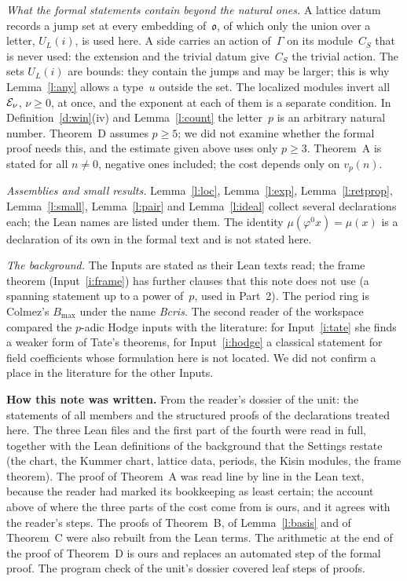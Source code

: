 \documentclass[11pt,a4paper]{article}
\newcommand{\m}[1]{\mbox{$#1$}}        %
\newcommand{\subhead}[1]{\par\addvspace{9pt plus 2pt}\Needspace{4\baselineskip}\noindent\textbf{#1}\enspace\ignorespaces}
\theoremstyle{plainx}
\theoremstyle{uprightx}
\providecommand{\fo}{\mathfrak{o}}\providecommand{\fc}{\mathfrak{c}}\providecommand{\fd}{\mathfrak{d}}
\begin{document}
\emph{What the formal statements contain beyond the natural ones.} A lattice datum records a jump set at every
embedding of~$\fo$, of which only the union over a letter, \m{U_L(i)}, is used here. A side carries an action of~$\Gamma$ on its module~$C_S$ that is never used: the extension and the trivial datum give~$C_S$ the trivial action. The sets \m{U_L(i)} are
bounds: they contain the jumps and may be larger; this is why Lemma~\ref{l:any} allows a type~$u$ outside the
set. The localized modules invert all~$\mathcal{E}_\nu$, \m{\nu\ge0}, at once, and the exponent at each of them is a
separate condition. In Definition~\ref{d:win}(iv) and Lemma~\ref{l:count} the letter~$p$ is an arbitrary natural
number. Theorem~D assumes \m{p\ge5}; we did not examine whether the formal proof needs this, and the estimate
given above uses only \m{p\ge3}. Theorem~A is stated for all \m{n\ne0}, negative ones included; the cost depends
only on \m{v_p(n)}.

\emph{Assemblies and small results.} Lemma~\ref{l:loc}, Lemma~\ref{l:exp}, Lemma~\ref{l:retprop},
Lemma~\ref{l:small}, Lemma~\ref{l:pair} and Lemma~\ref{l:ideal} collect several declarations each; the Lean
names are listed under them. The identity \m{\mu(\varphi^{0}x)=\mu(x)} is a declaration of its own in the formal
text and is not stated here.

\emph{The background.} The Inputs are stated as their Lean texts read; the frame theorem (Input~\ref{i:frame})
has further clauses that this note does not use (a spanning statement up to a power of~$p$, used in Part~2). The
period ring is Colmez's $B_{\max}$ under the name \emph{Bcris}. The second reader of the workspace compared the
$p$-adic Hodge inputs with the literature: for Input~\ref{i:tate} she finds a weaker form of Tate's theorems,
for Input~\ref{i:hodge} a classical statement for field coefficients whose formulation here is not located. We
did not confirm a place in the literature for the other Inputs.

\subhead{How this note was written.} From the reader's dossier of the unit: the statements of all members and
the structured proofs of the declarations treated here. The three Lean files and the first part of the fourth
were read in full, together with the Lean definitions of the background that the Settings restate (the chart, the
Kummer chart, lattice data, periods, the Kisin modules, the frame theorem). The proof of Theorem~A was read line
by line in the Lean text, because the reader had marked its bookkeeping as least certain; the account above of
where the three parts of the cost come from is ours, and it agrees with the reader's steps. The proofs of
Theorem~B, of Lemma~\ref{l:basis} and of Theorem~C were also rebuilt from the Lean terms. The arithmetic at the
end of the proof of Theorem~D is ours and replaces an automated step of the formal proof. The program check of
the unit's dossier covered \UnitSteps{} leaf steps of \UnitProofs{} proofs.
\end{document}
